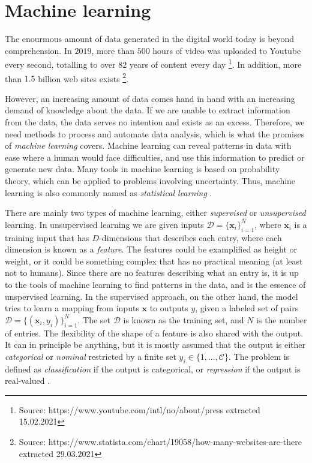 \chapter{Machine learning}

The enourmous amount of data generated in the digital world today is beyond comprehension. In $2019$, more than $500$ hours of video was uploaded to Youtube every second, totalling to over $82$ years of content every day \footnote{Source: https://www.youtube.com/intl/no/about/press extracted 15.02.2021}. In addition, more than $1.5$ billion web sites exists \footnote{Source: https://www.statista.com/chart/19058/how-many-websites-are-there extracted 29.03.2021}.

However, an increasing amount of data comes hand in hand with an increasing demand of knowledge about the data. If we are unable to extract information from the data, the data serves no intention and exists as an excess. Therefore, we need methods to process and automate data analysis, which is what the promises of \textit{machine learning} covers. Machine learning can reveal patterns in data with ease where a human would face difficulties, and use this information to predict or generate new data. Many tools in machine learning is based on probability theory, which can be applied to problems involving uncertainty. Thus, machine learning is also commonly named as \textit{statistical learning} \cite{Murphy2012}.

There are mainly two types of machine learning, either \textit{supervised} or \textit{unsupervised} learning. In unsupervised learning we are given inputs $\mathcal{D}=\{\textbf{x}_i\}^N_{i=1}$, where $\textbf{x}_i$ is a training input that has $D$-dimensions that describes each entry, where each dimension is known as a \textit{feature}. The features could be examplified as height or weight, or it could be something complex that has no practical meaning (at least not to humans). Since there are no features describing what an entry is, it is up to the tools of machine learning to find patterns in the data, and is the essence of unspervised learning. In the supervised approach, on the other hand, the model tries to learn a mapping from inputs $\textbf{x}$ to outputs $y$, given a labeled set of pairs $\mathcal{D}=\{(\textbf{x}_i, y_i)\}^N_{i=1}$. The set $\mathcal{D}$ is known as the training set, and $N$ is the number of entries. The flexibility of the shape of a feature is also shared with the output. It can in principle be anything, but it is mostly assumed that the output is either \textit{categorical} or \textit{nominal} restricted by a finite set $y_i \in \{1,...,\mathcal{C} \}$. The problem is defined as \textit{classification} if the output is categorical, or \textit{regression} if the output is real-valued \cite{Murphy2012}.

